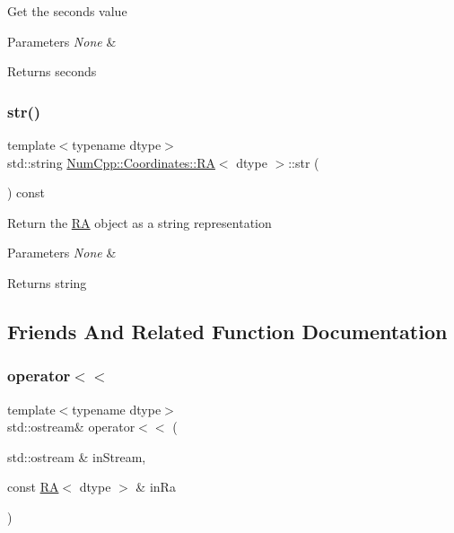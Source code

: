 Get the seconds value


\begin{DoxyParams}{Parameters}
{\em None} & \\
\hline
\end{DoxyParams}
\begin{DoxyReturn}{Returns}
seconds 
\end{DoxyReturn}
\mbox{\label{class_num_cpp_1_1_coordinates_1_1_r_a_a6253a846fef92d3b7ee2e8b97f33ca10}} 
\subsubsection{\texorpdfstring{str()}{str()}}
{\footnotesize\ttfamily template$<$typename dtype$>$ \\
std\+::string \mbox{\hyperlink{class_num_cpp_1_1_coordinates_1_1_r_a}{Num\+Cpp\+::\+Coordinates\+::\+RA}}$<$ dtype $>$\+::str (\begin{DoxyParamCaption}{ }\end{DoxyParamCaption}) const\hspace{0.3cm}{\ttfamily [inline]}}

Return the \mbox{\hyperlink{class_num_cpp_1_1_coordinates_1_1_r_a}{RA}} object as a string representation


\begin{DoxyParams}{Parameters}
{\em None} & \\
\hline
\end{DoxyParams}
\begin{DoxyReturn}{Returns}
string 
\end{DoxyReturn}


\subsection{Friends And Related Function Documentation}
\mbox{\label{class_num_cpp_1_1_coordinates_1_1_r_a_acba639d6020d3614a9cf1d47587c30fa}} 
\subsubsection{\texorpdfstring{operator$<$$<$}{operator<<}}
{\footnotesize\ttfamily template$<$typename dtype$>$ \\
std\+::ostream\& operator$<$$<$ (\begin{DoxyParamCaption}\item[{std\+::ostream \&}]{in\+Stream,  }\item[{const \mbox{\hyperlink{class_num_cpp_1_1_coordinates_1_1_r_a}{RA}}$<$ dtype $>$ \&}]{in\+Ra }\end{DoxyParamCaption})\hspace{0.3cm}{\ttfamily [friend]}}


